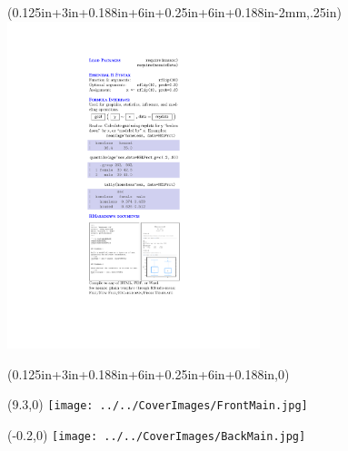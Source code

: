 \documentclass{article}
\newcommand{\trim}{0.125in}
\newcommand{\flap}{3in}
\newcommand{\wrap}{0.188in}
\newcommand{\cover}{6in}
\newcommand{\spine}{0.25in}
\begin{document}
\begin{textblock*}{3}(\trim+\flap+\wrap+\cover+\spine+\cover+\wrap-2mm,.25in) %
\includegraphics[width=2.9in]{frontflap.pdf}
\end{textblock*}

\begin{textblock*}{3}(\trim+\flap+\wrap+\cover+\spine+\cover+\wrap,0) %
\noindent{}
\end{textblock*}

\begin{textblock}{6.125}(9.3,0)
\noindent\texttt{[image: ../../CoverImages/FrontMain.jpg]}
\end{textblock}

\begin{textblock}{6.125}(-0.2,0)
\noindent\texttt{[image: ../../CoverImages/BackMain.jpg]}
\end{textblock}
\end{document}

